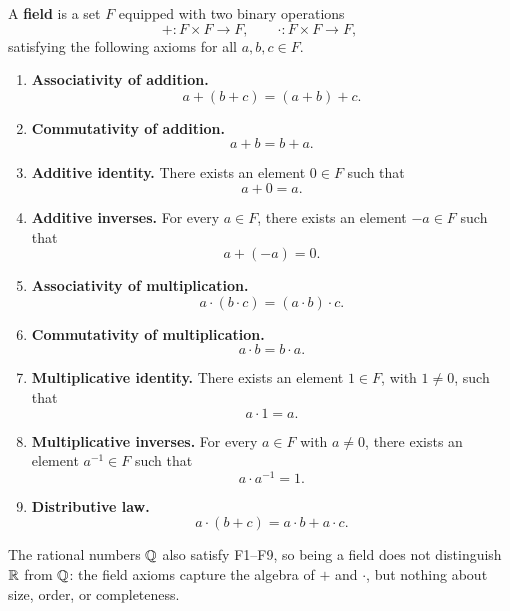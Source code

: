 \begin{definition}[Field]\label{def:field}
    A \textbf{field} is a set $F$ equipped with two binary operations
    \[
        + : F \times F \to F,
        \qquad
        \cdot : F \times F \to F,
    \]
    satisfying the following axioms for all $a,b,c \in F$.

    \begin{enumerate}[label=\textbf{F\arabic*.}, leftmargin=2.5em]
        \item \textbf{Associativity of addition.}
        \[
            a + (b + c) = (a + b) + c.
        \]

        \item \textbf{Commutativity of addition.}
        \[
            a + b = b + a.
        \]

        \item \textbf{Additive identity.}
        There exists an element $0 \in F$ such that
        \[
            a + 0 = a.
        \]

        \item \textbf{Additive inverses.}
        For every $a \in F$, there exists an element $-a \in F$ such that
        \[
            a + (-a) = 0.
        \]

        \item \textbf{Associativity of multiplication.}
        \[
            a \cdot (b \cdot c) = (a \cdot b) \cdot c.
        \]

        \item \textbf{Commutativity of multiplication.}
        \[
            a \cdot b = b \cdot a.
        \]

        \item \textbf{Multiplicative identity.}
        There exists an element $1 \in F$, with $1 \neq 0$, such that
        \[
            a \cdot 1 = a.
        \]

        \item \textbf{Multiplicative inverses.}
        For every $a \in F$ with $a \neq 0$, there exists an element $a^{-1} \in F$ such that
        \[
            a \cdot a^{-1} = 1.
        \]

        \item \textbf{Distributive law.}
        \[
            a \cdot (b + c) = a \cdot b + a \cdot c.
        \]
    \end{enumerate}
\end{definition}

The rational numbers $\mathbb{Q}$ also satisfy F1--F9, so being a field does not distinguish $\mathbb{R}$ from $\mathbb{Q}$: the field axioms capture the algebra of $+$ and $\cdot$, but nothing about size, order, or completeness.


